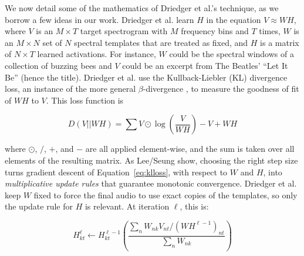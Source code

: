 \documentclass{article}
\begin{document}
We now detail some of the mathematics of Driedger et al.'s technique, as we borrow a few ideas in our work.  Driedger et al. learn $H$ in the equation $V \approx WH$, where $V$ is an $M \times T$ target spectrogram with $M$ frequency bins and $T$ times, $W$ is an $M \times N$ set of $N$ spectral templates that are treated as fixed, and $H$ is a matrix of $N \times T$ learned activations.  For instance, $W$ could be the spectral windows of a collection of buzzing bees and $V$ could be an excerpt from The Beatles' ``Let It Be'' (hence the title).  Driedger et al. use the Kullback-Liebler (KL) divergence loss, an instance of the more general $\beta$-divergence \cite{buch2017nichtnegativematrixfaktorisierungnutzendesklangsynthesensystem}, to measure the goodness of fit of $WH$ to $V$.  This loss function is 

\begin{equation}
\label{eq:klloss}
D(V || WH) = \sum V \odot \log \left( \frac{V}{WH} \right) - V + WH
\end{equation}

where $\odot$, $/$, $+$, and $-$ are all applied element-wise, and the sum is taken over all elements of the resulting matrix.  As Lee/Seung show, choosing the right step size turns gradient descent of Equation~\ref{eq:klloss}, with respect to $W$ and $H$, into {\em multiplicative update rules} that guarantee monotonic convergence.  Driedger et al. keep $W$ fixed to force the final audio to use exact copies of the templates, so only the update rule for $H$ is relevant.  At iteration $\ell$, this is:

\begin{equation}
\label{eq:klhgrad}
H_{kt}^{\ell} \gets H_{kt}^{\ell-1} \left( \frac{ \sum_{n} W_{nk} V_{nt} / (WH^{\ell-1})_{nt} }{ \sum_{n} W_{nk} } \right)
\end{equation}
\end{document}
